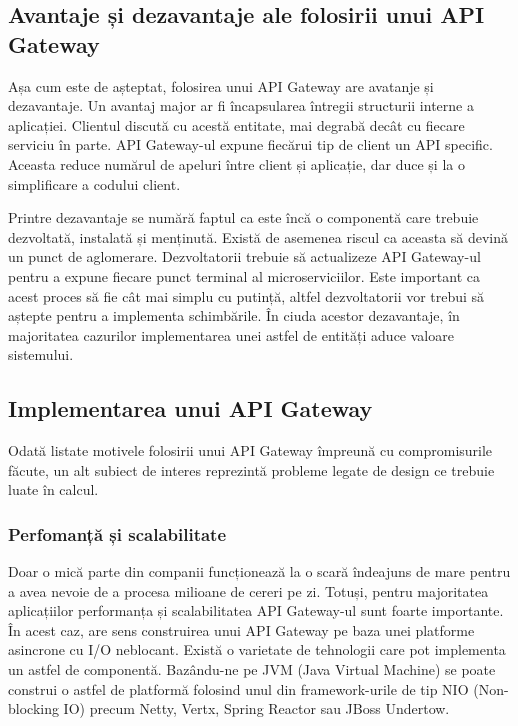 \documentclass[12pt, a4paper, oneside, romanian]{teza-upb}
\begin{document}
\subsection{Avantaje și dezavantaje ale folosirii unui API Gateway}

Așa cum este de așteptat, folosirea unui API Gateway are avatanje și dezavantaje. Un avantaj major ar fi încapsularea întregii structurii interne a aplicației. Clientul discută cu acestă entitate, mai degrabă decât cu fiecare serviciu în parte. API Gateway-ul expune fiecărui tip de client un API specific.  Aceasta reduce numărul de apeluri între client și aplicație, dar duce și la o simplificare a codului client. 

Printre dezavantaje se numără faptul ca este încă o componentă care trebuie dezvoltată, instalată și menținută. Există de asemenea riscul ca aceasta să devină un punct de aglomerare. Dezvoltatorii trebuie să actualizeze API Gateway-ul pentru a expune fiecare punct terminal al microserviciilor. Este important ca acest proces să fie cât mai simplu cu putință, altfel dezvoltatorii vor trebui să aștepte pentru a implementa schimbările. În ciuda acestor dezavantaje, în majoritatea cazurilor implementarea unei astfel de entități aduce valoare sistemului. 

\subsection{Implementarea unui API Gateway}

Odată listate motivele folosirii unui API Gateway împreună cu compromisurile făcute, un alt subiect de interes reprezintă probleme legate de design ce trebuie luate în calcul. 

\subsubsection{Perfomanță și scalabilitate}

Doar o mică parte din companii funcționează la o scară îndeajuns de mare pentru a avea nevoie de a procesa milioane de cereri pe zi. Totuși, pentru majoritatea aplicațiilor performanța și scalabilitatea API Gateway-ul sunt foarte importante. În acest caz, are sens construirea unui API Gateway pe baza unei platforme asincrone cu I/O neblocant. Există o varietate de tehnologii care pot implementa un astfel de componentă. Bazându-ne pe JVM (Java Virtual Machine) se poate construi o astfel de platformă folosind unul din framework-urile de tip NIO (Non-blocking IO) precum Netty, Vertx, Spring Reactor sau JBoss Undertow. 
\end{document}
